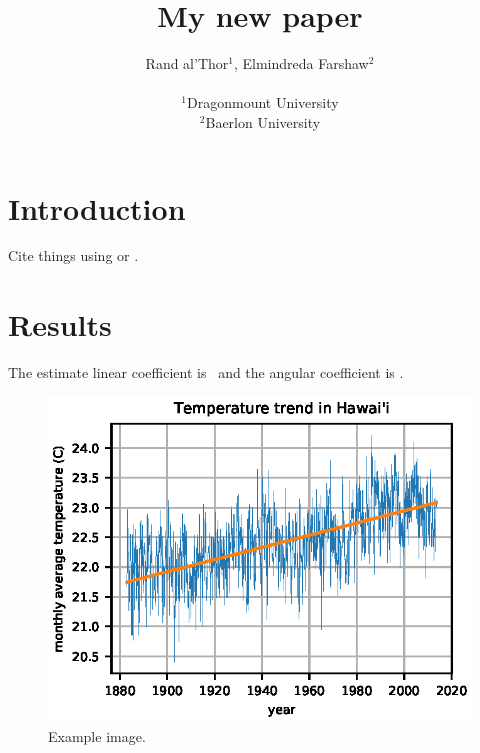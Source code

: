 \documentclass[twocolumn]{article}
\begin{document}
\title{
    My new paper
}
\author{
    Rand al'Thor$^{1}$,
    Elmindreda Farshaw$^{2}$
    \\\\
    {\small
        $^1$Dragonmount University
    }
    \\
    {\small
        $^2$Baerlon University
    }
}


\maketitle


\begin{abstract}
    \lipsum[1]
\end{abstract}


\section{Introduction}

Cite things using \citet{tikhonov1977} or \citep{tikhonov1977}.


\section{Results}

The estimate linear coefficient is \HawaiiLinearCoef\ and the angular
coefficient is \HawaiiAngularCoef.

\begin{figure}
    \centering
    \includegraphics[]{figures/hawaii-trend.eps}
    \caption{
        Example image.
    }
    \label{fig:meh}
\end{figure}
\end{document}
